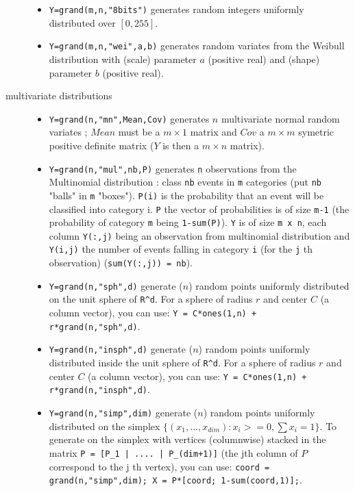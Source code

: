 \begin{description}
\begin{itemize}
\item {} \verb!Y=grand(m,n,"8bits")! generates random integers uniformly 
      distributed over $[0,255]$.
  
\item {} 
  \verb!Y=grand(m,n,"wei",a,b)! generates random variates from the Weibull 
  distribution with (scale) parameter $a$ (positive real) and (shape) parameter $b$ (positive real).
\end{itemize}

\item[multivariate distributions]
\begin{itemize}
\item {}
  \verb!Y=grand(n,"mn",Mean,Cov)! generates  $n$ multivariate normal random variates ; 
  $Mean$ must be a $m \times 1$ matrix and $Cov$ a  $m \times m$ 
  symetric positive definite matrix  ($Y$ is then a  $m \times n$
  matrix).

\item {} 
   \verb!Y=grand(n,"mul",nb,P)! generates \verb!n! observations from the Multinomial 
  distribution :  class \verb!nb! events in \verb!m! categories (put \verb!nb!
  "balls" in \verb!m! "boxes"). \verb!P(i)! is the probability 
  that an event will be classified into category i. \verb!P! the vector of probabilities
  is of size  \verb!m-1! (the probability of category \verb!m! being \verb!1-sum(P)!).
  \verb!Y! is of size \verb!m x n!, each column \verb!Y(:,j)! being an observation 
  from multinomial distribution and \verb!Y(i,j)! the number of events falling in category 
  \verb!i! (for the \verb!j! th observation) (\verb!sum(Y(:,j)) = nb!).
  
\item {}
  \verb!Y=grand(n,"sph",d)! generate ($n$) random points uniformly
  distributed on the unit sphere of \verb!R^d!. For a sphere of radius
  $r$ and center $C$ (a column vector), you can use: 
  \verb!Y = C*ones(1,n) + r*grand(n,"sph",d)!.
  
\item {}
  \verb!Y=grand(n,"insph",d)! generate ($n$) random points uniformly
  distributed inside the unit sphere of \verb!R^d!. For a sphere of radius
  $r$ and center $C$ (a column vector), you can use: 
  \verb!Y = C*ones(1,n) + r*grand(n,"insph",d)!.
  
\item {}
  \verb!Y=grand(n,"simp",dim)! generate ($n$) random points uniformly
  distributed on the simplex $\{ (x_1,...,x_{dim}): x_i >=0, \sum
  x_i = 1 \}$. To generate on the simplex with vertices (columnwise) 
  stacked in the matrix \verb!P = [P_1 | .... | P_(dim+1)]! (the jth column of $P$ 
  correspond to the j th  vertex), you can use:
  \verb!coord = grand(n,"simp",dim); X = P*[coord; 1-sum(coord,1)];!.
 

\end{itemize}
\end{description}
